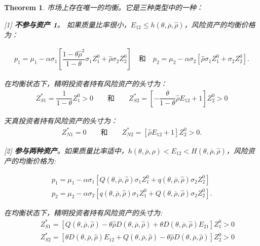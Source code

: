 \documentclass[10.0pt]{article}
\newtheorem{thm}{Theorem}
\begin{document}
\begin{thm}

市场上存在唯一的均衡。它是三种类型中的一种：



[1] {\bf 不参与资产 1}。 如果质量比率很小，$ E_{1 2} \leqslant h (\theta, \overline{\rho}, {\hat \rho}) $，风险资产的均衡价格为：

\begin{eqnarray*}
p_1 = \mu_1 - \alpha \sigma_1 \left[ \dfrac{1 - \theta {\hat \rho}^2}{1 - \theta} \sigma_1 Z_1^0 + {\hat \rho} \sigma_2 Z_2^0 \right] \quad \text{和} \quad p_2 = \mu_2 - \alpha \sigma_2 \left[ {\hat \rho} \sigma_1 Z_1^0 + \sigma_2 Z_2^0 \right].
\end{eqnarray*}

在均衡状态下，精明投资者持有风险资产的头寸为：
\begin{eqnarray*}
Z_{S 1}^* = \dfrac{1}{1 - \theta} Z_1^0 > 0 \qquad \text{和} \qquad Z_{S 2}^* = \left[ - \dfrac{\theta}{1 - \theta} {\hat \rho} E_{1 2} + 1 \right] Z_2^0 > 0
\end{eqnarray*}

天真投资者持有风险资产的头寸为：
\begin{eqnarray*}
Z_{N 1}^* = 0 \qquad \text{和} \qquad Z_{N 2}^* = \left[ {\hat \rho} E_{1 2} + 1 \right] Z_2^0 > 0.
\end{eqnarray*}



[2] {\bf 参与两种资产}。如果质量比率适中，$ h (\theta, \overline{\rho}, {\hat \rho}) < E_{1 2} < H (\theta, \overline{\rho}, {\hat \rho}) $，风险资产的均衡价格为:


\begin{eqnarray*}
& p_1 = \mu_1 - \alpha \sigma_1 \left[ Q (\theta, \overline{\rho}, {\hat \rho}) \sigma_1 Z_1^0 + q (\theta, \overline{\rho}, {\hat \rho}) \sigma_2 Z_2^0 \right] & \\
& p_2 = \mu_2 - \alpha \sigma_2 \left[ q (\theta, \overline{\rho}, {\hat \rho}) \sigma_1 Z_1^0 + Q (\theta, \overline{\rho}, {\hat \rho}) \sigma_2 Z_2^0 \right]. &
\end{eqnarray*}

在均衡状态下，精明投资者持有风险资产的头寸为:
\begin{eqnarray*}
& & Z_{S 1}^* = \left[ Q (\theta, \overline{\rho}, {\hat \rho}) - \theta {\hat \rho} D (\theta, \overline{\rho}, {\hat \rho}) + \theta D (\theta, \overline{\rho}, {\hat \rho}) E_{2 1} \right] Z_1^0 > 0 \\
& & Z_{S 2}^* = \left[ \theta D (\theta, \overline{\rho}, {\hat \rho}) E_{1 2} + Q (\theta, \overline{\rho}, {\hat \rho}) - \theta {\hat \rho} D (\theta, \overline{\rho}, {\hat \rho}) \right] Z_2^0 > 0
\end{eqnarray*}


\end{thm}
\end{document}
